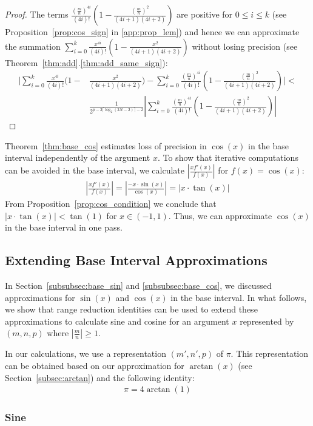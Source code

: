 \documentclass{article}
\numberwithin{mytheorem}{section}
\begin{document}
\begin{proof}
The terms $\frac{(\frac{m}{n})^{4i}}{(4i)!}(1-\frac{(\frac{m}{n})^2}{(4i+1)(4i+2)})$ are positive for $0\leq i\leq k$ (see Proposition~\ref{prop:cos_sign} in \ref{app:prop_lem}) and hence we can approximate the summation $\sum_{i=0}^{k}\frac{x^{4i}}{(4i)!}(1-\frac{x^2}{(4i+1)(4i+2)})$ without losing precision (see Theorem~\ref{thm:add}.\ref{thm:add_same_sign}):
\begin{align*}
|\sum_{i=0}^{k}\frac{x^{4i}}{(4i)!}(1-&\frac{x^2}{(4i+1)(4i+2)})-\sum_{i=0}^{k}\frac{(\frac{m}{n})^{4i}}{(4i)!}(1-\frac{(\frac{m}{n})^2}{(4i+1)(4i+2)})|<\\
~~~~~&\frac{1}{2^{p-2\lceil\log_2(2N-2) \rceil -2}}|\sum_{i=0}^{k}\frac{(\frac{m}{n})^{4i}}{(4i)!}(1-\frac{(\frac{m}{n})^2}{(4i+1)(4i+2)})|
\end{align*}
\end{proof}


Theorem~\ref{thm:base_cos} estimates loss of precision in $\cos(x)$ in the base interval independently of the argument $x$. To show that iterative computations can be avoided in the base interval, we calculate $|\frac{xf'(x)}{f(x)}|$ for $f(x)=\cos(x)$:
\begin{align}
|\frac{xf'(x)}{f(x)}|=|\frac{-x\cdot \sin(x)}{\cos(x)}|=|x\cdot \tan(x)|\label{eqn:pert_cos}
\end{align}
From Proposition~\ref{prop:cos_condition} we conclude that $|x\cdot \tan(x)|<\tan(1)$ for $x\in (-1,1)$. Thus, we can approximate $\cos(x)$ in the base interval in one pass.
 
\subsection{Extending Base Interval Approximations}\label{subsec:extend}
In Section~\ref{subsubsec:base_sin} and \ref{subsubsec:base_cos}, we discussed approximations for $\sin(x)$ and $\cos(x)$ in the base interval. In what follows, we show that range reduction identities can be used to extend these approximations to calculate sine and cosine for an argument $x$ represented by $(m,n,p)$ where $|\frac{m}{n}|\geq 1$.

In our calculations, we use a representation $(m',n',p)$ of $\pi$. This representation can be obtained based on our approximation for $\arctan(x)$ (see Section~\ref{subsec:arctan}) and the following identity:
\begin{align*}
\pi=4\arctan(1)
\end{align*}

\subsubsection{Sine}\label{subsubsec:extend_sin}
\end{document}
